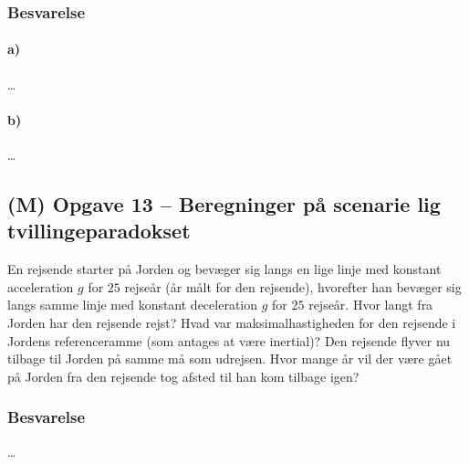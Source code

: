 \documentclass[../main.tex]{subfiles}
\begin{document}

\subsubsection{Besvarelse}


\paragraph{a)}

\ldots



\paragraph{b)}

\ldots




\subsection{(M) Opgave 13 -- Beregninger på scenarie lig tvillingeparadokset}
\setcounter{subsection}{13}
\setcounter{equation}{0}

En rejsende starter på Jorden og bevæger sig langs en lige linje med konstant acceleration $g$ for $25$ rejseår (år målt for den rejsende), hvorefter han bevæger sig langs samme linje med konstant deceleration $g$ for $25$ rejseår. Hvor langt fra Jorden har den rejsende rejst? Hvad var maksimalhastigheden for den rejsende i Jordens referenceramme (som antages at være inertial)? Den rejsende flyver nu tilbage til Jorden på samme må som udrejsen. Hvor mange år vil der være gået på Jorden fra den rejsende tog afsted til han kom tilbage igen?


\subsubsection{Besvarelse}

\ldots



\end{document}
